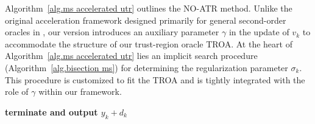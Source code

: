 \documentclass{mcom-l}
\numberwithin{equation}{section}
\begin{document}
Algorithm~\ref{alg.ms accelerated utr} outlines the NO-ATR method. Unlike the original acceleration framework designed primarily for general second-order oracles in \citet{monteiro2013accelerated}, our version introduces an auxiliary parameter $\gamma$ in the update of $v_k$ to accommodate the structure of our trust-region oracle TROA. At the heart of Algorithm~\ref{alg.ms accelerated utr} lies an implicit search procedure (Algorithm~\ref{alg.bisection ms}) for determining the regularization parameter $\sigma_k$. This procedure is customized to fit the TROA and is tightly integrated with the role of $\gamma$ within our framework.
\begin{algorithm}[ht]
    \caption{Near-Optimal Accelerated Trust-Region Method~(\atrms{})}\label{alg.ms accelerated utr}
    \begin{algorithmic}[1]
        \STATE \textbf{terminate and output $y_k+d_k$
            \label{line.early terminate ms}
        }
        \ENDIF
        \ENDFOR
    \end{algorithmic}
\end{algorithm}
\end{document}
